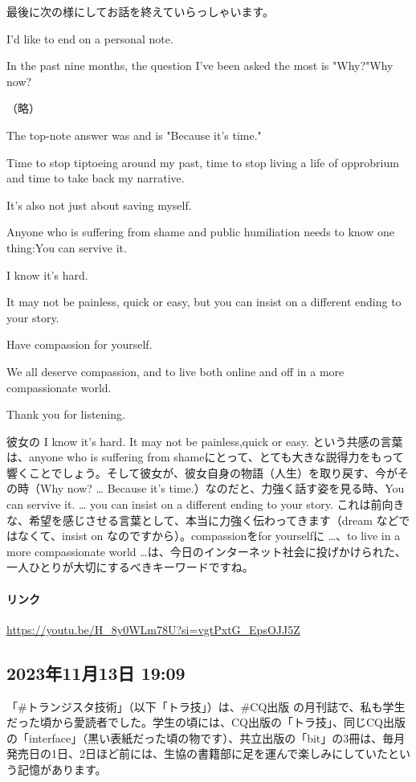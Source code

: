 最後に次の様にしてお話を終えていらっしゃいます。

I'd like to end on a personal note.

In the past nine months, the question I've been asked the most is "Why?"Why now?

（略）

The top-note answer was and is "Because it's time."

Time to stop tiptoeing around my past, time to stop living a life of opprobrium and time to take back my narrative.

It's also not just about saving myself.

Anyone who is suffering from shame and public humiliation needs to know one thing:You can servive it.

I know it's hard.

It may not be painless, quick or easy, but you can insist on a different ending to your story.

Have compassion for yourself.

We all deserve compassion, and to live both online and off in a more compassionate world.

Thank you for listening.

彼女の I know it’s hard. It may not be painless,quick or easy. という共感の言葉は、anyone who is suffering from shameにとって、とても大きな説得力をもって響くことでしょう。そして彼女が、彼女自身の物語（人生）を取り戻す、今がその時（Why now? … Because it’s time.）なのだと、力強く話す姿を見る時、You can servive it. … you can insist on a different ending to your story. これは前向きな、希望を感じさせる言葉として、本当に力強く伝わってきます（dream などではなくて、insist on なのですから）。compassionをfor yourselfに …、to live in a more compassionate world …は、今日のインターネット社会に投げかけられた、一人ひとりが大切にするべきキーワードですね。

\paragraph{リンク}
\url{https://youtu.be/H_8y0WLm78U?si=vgtPxtG_EpsOJJ5Z}

\subsection*{2023年11月13日 19:09}

「\#トランジスタ技術」（以下「トラ技」）は、\#CQ出版 の月刊誌で、私も学生だった頃から愛読者でした。学生の頃には、CQ出版の「トラ技」、同じCQ出版の「interface」（黒い表紙だった頃の物です）、共立出版の「bit」の3冊は、毎月発売日の1日、2日ほど前には、生協の書籍部に足を運んで楽しみにしていたという記憶があります。

